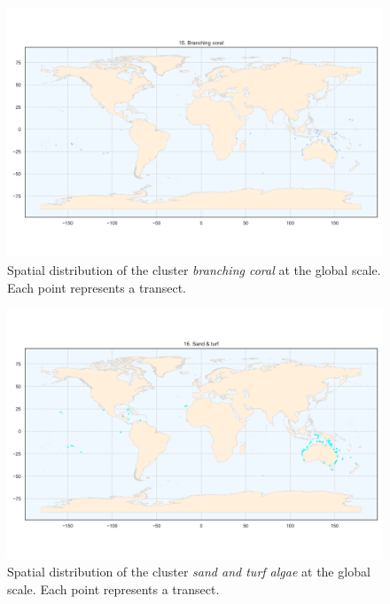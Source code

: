 \begin{figure}
\hypertarget{fig:chap2figS17}{%
\centering
\includegraphics{03-Chapitre2/figures/supplementary/06-spatial-cluster_distribution_cluster_14.png}
\caption{Spatial distribution of the cluster \emph{branching coral} at
the global scale. Each point represents a
transect.}\label{fig:chap2figS17}
}
\end{figure}

\begin{figure}
\hypertarget{fig:chap2figS18}{%
\centering
\includegraphics{03-Chapitre2/figures/supplementary/06-spatial-cluster_distribution_cluster_15.png}
\caption{Spatial distribution of the cluster \emph{sand and turf algae}
at the global scale. Each point represents a
transect.}\label{fig:chap2figS18}
}
\end{figure}

